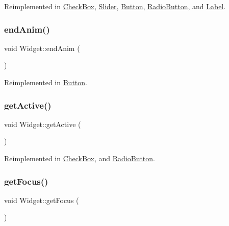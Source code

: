 Reimplemented in \mbox{\hyperlink{class_check_box_ade6c518dbbed2d24f101af024b08495f}{Check\+Box}}, \mbox{\hyperlink{class_slider_a8d2355aa14e267385d7d0f79300ffc6b}{Slider}}, \mbox{\hyperlink{class_button_a57937c3a08fac52fede0362b8ee6c39e}{Button}}, \mbox{\hyperlink{class_radio_button_aa8efb2e8d54a0293fd1058a7e49ca526}{Radio\+Button}}, and \mbox{\hyperlink{class_label_acaf5dfeeab3e46b5795b8cd24c9d94fe}{Label}}.

\mbox{\label{class_widget_abbbedd98778706d6a7cfe2ecf27413fb}} 
\subsubsection{\texorpdfstring{endAnim()}{endAnim()}}
{\footnotesize\ttfamily void Widget\+::end\+Anim (\begin{DoxyParamCaption}{ }\end{DoxyParamCaption})\hspace{0.3cm}{\ttfamily [virtual]}}



Reimplemented in \mbox{\hyperlink{class_button_ad0356a9996631f350fee4a02c66a4cf5}{Button}}.

\mbox{\label{class_widget_a255e13ebf55d19f93a37b7a1aec9a87f}} 
\subsubsection{\texorpdfstring{getActive()}{getActive()}}
{\footnotesize\ttfamily void Widget\+::get\+Active (\begin{DoxyParamCaption}{ }\end{DoxyParamCaption})\hspace{0.3cm}{\ttfamily [virtual]}}



Reimplemented in \mbox{\hyperlink{class_check_box_a40948ae138e422b4b025c225e1c532b5}{Check\+Box}}, and \mbox{\hyperlink{class_radio_button_a168305da89d8c859e170fbc50abbe5b3}{Radio\+Button}}.

\mbox{\label{class_widget_a546c3b96bd793596c4902b4df0c41272}} 
\subsubsection{\texorpdfstring{getFocus()}{getFocus()}}
{\footnotesize\ttfamily void Widget\+::get\+Focus (\begin{DoxyParamCaption}{ }\end{DoxyParamCaption})\hspace{0.3cm}{\ttfamily [virtual]}}



